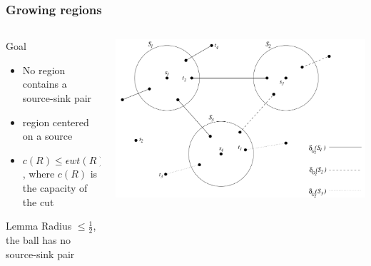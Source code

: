 \documentclass[12pt,aspectratio=169]{beamer}
\begin{document}
\begin{frame}\frametitle{Growing regions }
\begin{columns} 
  \begin{column}{0.48\textwidth}
  \begin{block}{Goal}
    \begin{itemize}
    \item
      No region contains a source-sink pair
    \item
      region centered on a source
    \item
      $c(R) \le \epsilon wt(R)$, where $c(R)$ is the capacity of the cut
    \end{itemize}
  \end{block}
  \begin{block}{Lemma}
    Radius $\le \frac{1}{2}$, the ball has no source-sink pair
  \end{block}
\end{column}
    \begin{column}{0.4\textwidth}
      \centering
  \includegraphics[height=0.5\textheight]{img/growing}
\end{column}
\end{columns}
\end{frame}
\end{document}

